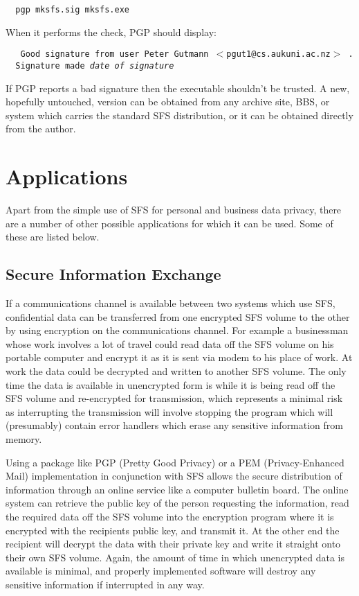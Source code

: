{\tt \verb|  |pgp mksfs.sig mksfs.exe}

When it performs the check, PGP should display:

{\tt
\verb|  |Good signature from user Peter Gutmann $<$pgut1@cs.aukuni.ac.nz$>$ .\\
\verb|  |Signature made {\em date of signature}}

If PGP reports a bad signature then the executable shouldn't be trusted.  A
new, hopefully untouched, version can be obtained from any archive site, BBS,
or system which carries the standard SFS distribution, or it can be obtained
directly from the author.


\section{Applications}

Apart from the simple use of SFS for personal and business data privacy, there
are a number of other possible applications for which it can be used.  Some of
these are listed below.


\subsection{Secure Information Exchange}

If a communications channel is available between two systems which use SFS,
confidential data can be transferred from one encrypted SFS volume to the other
by using encryption on the communications channel.  For example a businessman
whose work involves a lot of travel could read data off the SFS volume on his
portable computer and encrypt it as it is sent via modem to his place of work.
At work the data could be decrypted and written to another SFS volume.  The
only time the data is available in unencrypted form is while it is being read
off the SFS volume and re-encrypted for transmission, which represents a
minimal risk as interrupting the transmission will involve stopping the program
which will (presumably) contain error handlers which erase any sensitive
information from memory.

Using a package like PGP (Pretty Good Privacy) or a PEM (Privacy-Enhanced Mail)
implementation in conjunction with SFS allows the secure distribution of 
information through an online service like a computer bulletin board.  The 
online system can retrieve the public key of the person requesting the 
information, read the required data off the SFS volume into the encryption 
program where it is encrypted with the recipients public key, and transmit it.  
At the other end the recipient will decrypt the data with their private key and 
write it straight onto their own SFS volume.  Again, the amount of time in 
which unencrypted data is available is minimal, and properly implemented 
software will destroy any sensitive information if interrupted in any way.


